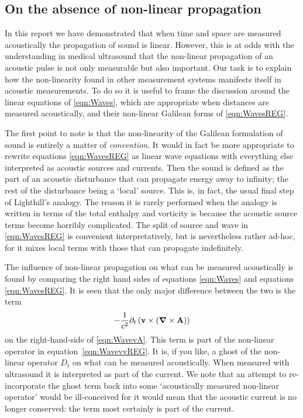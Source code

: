 \documentclass[10pt, fleqn,final,showtrims,oldfontcommands, article,a4paper,oneside]{memoir} %
\newcommand{\eqa}[1]{\begin{align}#1\end{align}}
\newcommand{\eqnref}[1]{\ref{eqn:#1}}
\newcommand{\lr}[1]{\left( #1 \right)}
\renewcommand{\d}{\partial}
\newcommand{\del}{\nabla}
\newcommand{\vdel}{ \mbox{\boldmath $\del$}}
\newcommand{\dt}{{\d_t}}
\newcommand{\Dt}{D_t}
\newcommand{\vA}{\textbf{A}}
\newcommand{\vv}{\textbf{v}}
\begin{document}
\subsection{On the absence of non-linear propagation} \label{sec:NonlinearProp}

In this report we have demonstrated that when time and space are measured acoustically
the propagation of sound is linear.
However, this is at odds with the  understanding in medical ultrasound that the non-linear propagation of an acoustic pulse
is not only measurable but also important.
Our task is to explain how the non-linearity found in other measurement systems  manifests itself in acoustic measurements.
To do so it is useful to frame the discussion around the linear equations of
\eqnref{Waves},
 which are appropriate when distances are measured acoustically,
and their non-linear Galilean forms of \eqnref{WavesREG}.

The first point to note is that the non-linearity of the Galilean formulation of sound is entirely a matter of {\em  convention}.
It would in fact be more appropriate to rewrite equations \eqnref{WavesREG} as linear wave equations with everything else interpreted as acoustic sources and currents.
Then the sound is defined as the part of an acoustic disturbance that can propagate energy away to infinity;
the rest of the disturbance being a `local' source.
This is, in fact, the usual final step of Lighthill's analogy.
The reason it is rarely performed when the analogy is written in terms of the total enthalpy and vorticity is because
the acoustic source terms become horribly complicated.
The split of source and wave in \eqnref{WavesREG} is convenient  interpretatively, but is nevertheless rather ad-hoc,
for it mixes local terms with those that can propagate indefinitely.

The influence of non-linear propagation on what can be measured acoustically is found by comparing the right hand sides of equations \eqnref{Waves} and equations \eqnref{WavesREG}.
It is seen that the only major difference between the two is the term 
\eqa{
- \frac{1}{c^2}\dt \lr{ \vv \times \lr{\vdel \times \vA}} \nonumber
}
 on the right-hand-side of \eqnref{WavevA}.
This term is part of the non-linear operator in equation~\ref{eqn:WavevvREG}.
It is, if you like, a ghost of the non-linear operator $\Dt$ on what can be measured acoustically.
When measured with ultrasound it is interpreted  as part of the current.
We note that an attempt to re-incorporate the ghost  term back into some `acoustically measured non-linear operator' would be ill-conceived 
for it would mean that the acoustic current is no longer conserved:
the term %
most certainly is part of the current.
\end{document}
